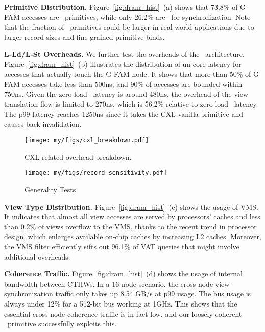 \noindent \textbf{Primitive Distribution.}
Figure~\ref{fig:dram_hist}~(a) shows that 73.8\% of G-FAM accesses are \name~primitives, while only 26.2\% are \vanilla~for synchronization. Note that the fraction of \name~primitives could be larger in real-world applications due to larger record sizes and fine-grained primitive binds. 

\noindent \textbf{L-Ld/L-St Overheads.}
We further test the overheads of the \name~architecture. 
Figure~\ref{fig:dram_hist}~(b) illustrates the distribution of un-core latency for accesses that actually touch the G-FAM node. It shows that more than 50\% of G-FAM accesses take less than 500ns, and 90\% of accesses are bounded within 750ns. Given the zero-load \cxlmem~latency is around 480ns, the overhead of the view translation flow is limited to 270ns, which is 56.2\% relative to zero-load \cxlmem~latency. The p99 latency reaches 1250ns since it takes the CXL-vanilla primitive and causes back-invalidation. 

\begin{figure*}[t]
  \centering
  \texttt{[image: my/figs/cxl\_breakdown.pdf]}
  \caption{CXL-related overhead breakdown. }
  \label{fig:overhead_breakdown}
\end{figure*}


\begin{figure}[t]
  \centering
  \texttt{[image: my/figs/record\_sensitivity.pdf]}
  \caption{Generality Tests}
  \label{fig:record_sensitivity}
\end{figure}

\noindent \textbf{View Type Distribution.}
Figure~\ref{fig:dram_hist}~(c) shows the usage of VMS. It indicates that almost all view accesses are served by processors' caches and less than 0.2\% of views overflow to the VMS, thanks to the recent trend in processor design, which enlarges available on-chip caches by increasing L2 caches. Moreover, the VMS filter efficiently sifts out 96.1\% of VAT queries that might involve additional overheads. 

\noindent \textbf{Coherence Traffic.}
Figure~\ref{fig:dram_hist}~(d) shows the usage of internal bandwidth between CTHWs. In a 16-node scenario, the cross-node view synchronization traffic only takes up 8.54 GB/s at p99 usage. The bus usage is always under 12\% for a 512-bit bus working at 1GHz. This shows that the essential cross-node coherence traffic is in fact low, and our loosely coherent \name~primitive successfully exploits this.

